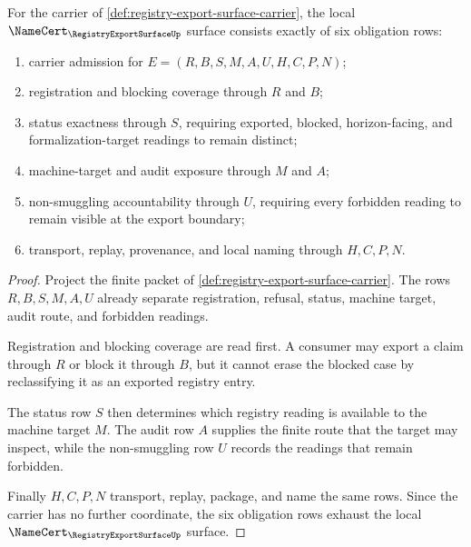 \begin{theorem}
\label{thm:registry-export-surface-namecert-obligations}
For the carrier of \autoref{def:registry-export-surface-carrier}, the local $\NameCert_{\RegistryExportSurfaceUp}$ surface consists exactly of six obligation rows:
\begin{enumerate}
\item carrier admission for $E=(R,B,S,M,A,U,H,C,P,N)$;
\item registration and blocking coverage through $R$ and $B$;
\item status exactness through $S$, requiring exported, blocked, horizon-facing, and formalization-target readings to remain distinct;
\item machine-target and audit exposure through $M$ and $A$;
\item non-smuggling accountability through $U$, requiring every forbidden reading to remain visible at the export boundary;
\item transport, replay, provenance, and local naming through $H,C,P,N$.
\end{enumerate}
\end{theorem}
\begin{proof}
Project the finite packet of \autoref{def:registry-export-surface-carrier}. The rows $R,B,S,M,A,U$ already separate registration, refusal, status, machine target, audit route, and forbidden readings.

Registration and blocking coverage are read first. A consumer may export a claim through $R$ or block it through $B$, but it cannot erase the blocked case by reclassifying it as an exported registry entry.

The status row $S$ then determines which registry reading is available to the machine target $M$. The audit row $A$ supplies the finite route that the target may inspect, while the non-smuggling row $U$ records the readings that remain forbidden.

Finally $H,C,P,N$ transport, replay, package, and name the same rows. Since the carrier has no further coordinate, the six obligation rows exhaust the local $\NameCert_{\RegistryExportSurfaceUp}$ surface.
\end{proof}

